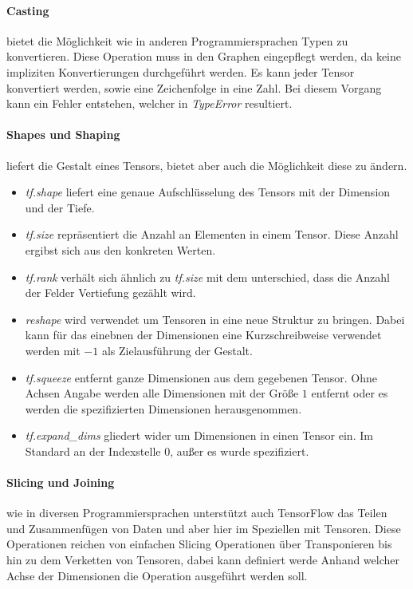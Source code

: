 \paragraph{Casting} bietet die Möglichkeit wie in anderen Programmiersprachen Typen zu konvertieren. 
Diese Operation muss in den Graphen eingepflegt werden, da keine impliziten Konvertierungen durchgeführt werden. 
Es kann jeder Tensor konvertiert werden, sowie eine Zeichenfolge in eine Zahl. 
Bei diesem Vorgang kann ein Fehler entstehen, welcher in \textit{TypeError} resultiert.

\paragraph{Shapes und Shaping} liefert die Gestalt eines Tensors, bietet aber auch die Möglichkeit diese zu ändern. 
\begin{itemize}
	\item \textit{tf.shape} liefert eine genaue Aufschlüsselung des Tensors mit der Dimension und der Tiefe.
	\item \textit{tf.size} repräsentiert die Anzahl an Elementen in einem Tensor. 
	Diese Anzahl ergibst sich aus den konkreten Werten.
	\item \textit{tf.rank} verhält sich ähnlich zu \textit{tf.size} mit dem unterschied, dass die Anzahl der Felder Vertiefung gezählt wird.
	\item \textit{reshape} wird verwendet um Tensoren in eine neue Struktur zu bringen. 
	Dabei kann für das einebnen der Dimensionen eine Kurzschreibweise verwendet werden mit $-1$ als Zielausführung der Gestalt.
	\item \textit{tf.squeeze} entfernt ganze Dimensionen aus dem gegebenen Tensor. 
	Ohne Achsen Angabe werden alle Dimensionen mit der Größe $1$ entfernt oder es werden die spezifizierten Dimensionen herausgenommen.
	\item \textit{tf.expand\_dims} gliedert wider um Dimensionen in einen Tensor ein. 
	Im Standard an der Indexstelle $0$, außer es wurde spezifiziert.
\end{itemize}

\paragraph{Slicing und Joining} wie in diversen Programmiersprachen unterstützt auch TensorFlow das Teilen und Zusammenfügen von Daten und aber hier im Speziellen mit Tensoren. 
Diese Operationen reichen von einfachen Slicing Operationen über Transponieren bis hin zu dem Verketten von Tensoren, dabei kann definiert werde Anhand welcher Achse der Dimensionen die Operation ausgeführt werden soll.


